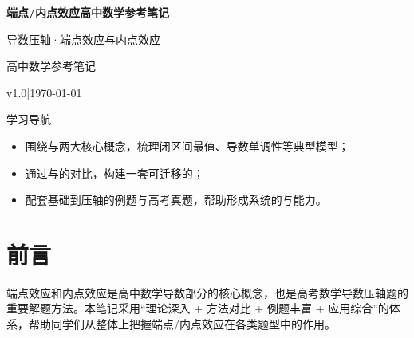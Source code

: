 \documentclass[a4paper,12pt]{ctexrep}
\renewcommand{\notetitle}{端点/内点效应高中数学参考笔记}
\renewcommand{\noteauthor}{高中数学参考笔记}
\renewcommand{\notedate}{\today}
\renewcommand{\notesubtitle}{导数压轴·端点效应与内点效应}
\renewcommand{\noteversion}{v1.0}
\begin{document}
\thispagestyle{empty}
\setcounter{page}{1}

\MathNoteEnablePrint

\noindent
\begin{minipage}[t][0.7\textheight][c]{\textwidth}
  \raggedleft
  \vspace*{\fill}
  {\sffamily\bfseries\Huge\color{accent}\notetitle\par}
  \vspace{0.6em}
  {\Large\color{inkgray}\notesubtitle\par}
  \vspace{0.5em}
  {\large\color{inkgray}\noteauthor\par}
  \vspace{0.4em}
  {\normalsize\color{inkgray}\noteversion\quad|\quad\notedate\par}
  \vspace*{\fill}
\end{minipage}

\begin{center}
\begin{minipage}{0.84\textwidth}
  \textcolor{inkgray}{\sffamily\small 学习导航}\\
  \begin{itemize}
    \item 围绕与两大核心概念，梳理闭区间最值、导数单调性等典型模型；
    \item 通过与的对比，构建一套可迁移的；
    \item 配套基础到压轴的例题与高考真题，帮助形成系统的与能力。
  \end{itemize}
\end{minipage}
\end{center}
\vspace{1em}

\clearpage
\thispagestyle{plain}

\tableofcontents
\newpage

\chapter*{\heiti 前言}

端点效应和内点效应是高中数学导数部分的核心概念，也是高考数学导数压轴题的重要解题方法。本笔记采用“理论深入 + 方法对比 + 例题丰富 + 应用综合”的体系，帮助同学们从整体上把握端点/内点效应在各类题型中的作用。
\end{document}
